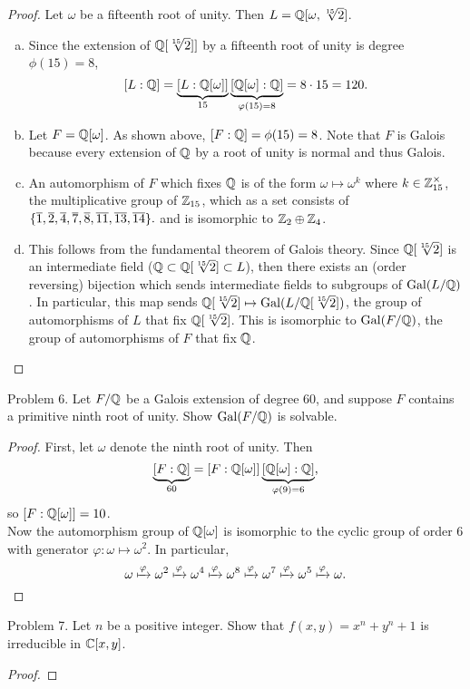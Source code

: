\documentclass{article}
\begin{document}
\begin{proof}
  Let $\omega$ be a fifteenth root of unity. Then $L = \mathbb Q[\omega, \sqrt[15]2]$.
  \begin{enumerate}[(a)]
    \item Since the extension of $\mathbb Q[\sqrt[15]2]]$ by a fifteenth root of unity
    is degree $\phi(15) = 8$, \[
      [L:\mathbb Q] =
      \underbrace{[L:\mathbb Q[\omega]]}_{15}
      \underbrace{[\mathbb Q[\omega]:\mathbb Q]}_{\varphi(15)=8}
      = 8 \cdot 15 = 120.
    \]
    \item Let $F = \mathbb Q[\omega]$. As shown above, $[F:\mathbb Q] = \phi(15) = 8$.
    Note that $F$ is Galois because every extension of $\mathbb Q$ by a root of unity
    is normal and thus Galois.
    \item An automorphism of $F$ which fixes $\mathbb Q$ is of the form
    $\omega \mapsto \omega^k$ where $k \in \mathbb Z_{15}^\times$, the multiplicative
    group of $\mathbb Z_{15}$, which as a set consists of $
      \{
        \overline 1,\overline 2,\overline 4,\overline 7,
        \overline 8,\overline{11},\overline{13},\overline{14}
      \}.
    $ and is isomorphic to $\mathbb Z_2 \oplus \mathbb Z_4$.
    \item This follows from the fundamental theorem of Galois theory.
    Since $\mathbb Q[\sqrt[15]2]$ is an intermediate field
    (${\mathbb Q \subset \mathbb Q[\sqrt[15]2] \subset L}$), then there
    exists an (order reversing) bijection which sends intermediate fields to
    subgroups of $\operatorname{Gal}(L/\mathbb Q)$. In particular, this map sends
    $\mathbb Q[\sqrt[15]2] \mapsto \operatorname{Gal}(L/\mathbb Q[\sqrt[15]2])$, the group of automorphisms
    of $L$ that fix $\mathbb Q[\sqrt[15]2]$. This is isomorphic to $\operatorname{Gal}(F/\mathbb Q)$, the
    group of automorphisms of $F$ that fix $\mathbb Q$.
  \end{enumerate}
\end{proof}
\pagebreak

\begin{subsection}{Problem 6.}
  Let $F/\mathbb Q$ be a Galois extension of degree $60$, and suppose $F$ contains a primitive ninth root of unity. Show $\operatorname{Gal}(F/\mathbb Q)$ is solvable.
\end{subsection}

\begin{proof}
  First, let $\omega$ denote the ninth root of unity. Then \[
    \underbrace{[F : \mathbb Q]}_{60} = [F : \mathbb Q[\omega]]\underbrace{[\mathbb Q[\omega] : \mathbb Q]}_{\varphi(9) = 6},
  \] so $[F : \mathbb Q[\omega]] = 10$.
  \\
  Now the automorphism group of $\mathbb Q[\omega]$ is isomorphic to the cyclic group
  of order $6$ with generator ${\varphi\colon \omega \mapsto \omega^2}$.
  In particular, \[
    \omega
    \xmapsto{\varphi} \omega^2 \xmapsto{\varphi} \omega^4
    \xmapsto{\varphi} \omega^8 \xmapsto{\varphi} \omega^7
    \xmapsto{\varphi} \omega^5 \xmapsto{\varphi} \omega.
  \]
\end{proof}
\pagebreak

\begin{subsection}{Problem 7.}
  Let $n$ be a positive integer. Show that $f(x,y) = x^n + y^n + 1$ is irreducible in $\mathbb C[x,y]$.
\end{subsection}

\begin{proof}
\end{proof}
\end{document}
